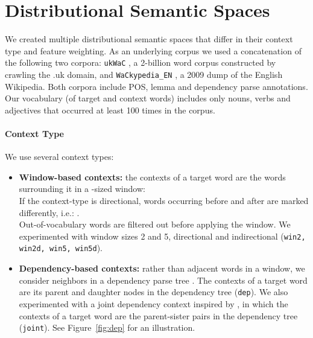 \documentclass[11pt]{article}
\newcommand\smalltt[1]{\texttt{\small #1}}
\begin{document}
\section{Distributional Semantic Spaces}
\label{sec:dsm}

We created multiple distributional semantic spaces that differ in their context type and feature weighting. 
As an underlying corpus we used a concatenation of the following two corpora: \smalltt{ukWaC} \cite{ferraresi2007building}, a 2-billion word corpus constructed by crawling the .uk domain, and \smalltt{WaCkypedia\_EN} \cite{baroni2009wacky}, a 2009 dump of the English Wikipedia. Both corpora include POS, lemma and dependency parse annotations. Our vocabulary (of target and context words) includes only nouns, verbs and adjectives that occurred at least 100 times in the corpus.


\paragraph{Context Type} We use several context types: 

\begin{itemize}[leftmargin=*]

\vspace*{-2pt}
\item \textbf{Window-based contexts:} the contexts of a target word  are the words surrounding it in a -sized window: \\If the context-type is directional, words occurring before and after  are marked differently, i.e.: .\\Out-of-vocabulary words are filtered out before applying the window. We experimented with window sizes 2 and 5, directional and indirectional (\smalltt{win2, win2d, win5, win5d}). 

\vspace*{-2pt}
\item \textbf{Dependency-based contexts:} rather than adjacent words in a window, we consider neighbors in a dependency parse tree \cite{pado2007dependency,baroni2010distributional}. The contexts of a target word  are its parent and daughter nodes in the dependency tree (\smalltt{dep}). We also experimented with a joint dependency context inspired by , in which the contexts of a target word are the parent-sister pairs in the dependency tree (\smalltt{joint}). See Figure~\ref{fig:dep} for an illustration. 
\end{itemize}
\vspace*{-2pt}
\end{document}
